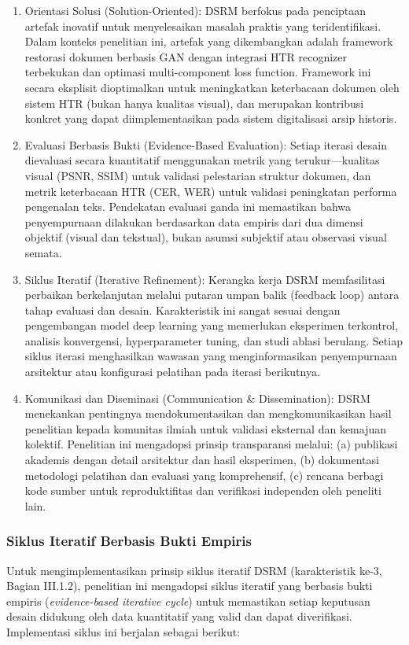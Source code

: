 \documentclass[12pt,a4paper]{article}
\begin{document}
\begin{enumerate}[label=\arabic*., leftmargin=*, nosep]
\item Orientasi Solusi (Solution-Oriented): DSRM berfokus pada penciptaan artefak inovatif untuk menyelesaikan masalah praktis yang teridentifikasi. Dalam konteks penelitian ini, artefak yang dikembangkan adalah framework restorasi dokumen berbasis GAN dengan integrasi HTR recognizer terbekukan dan optimasi multi-component loss function. Framework ini secara eksplisit dioptimalkan untuk meningkatkan keterbacaan dokumen oleh sistem HTR (bukan hanya kualitas visual), dan merupakan kontribusi konkret yang dapat diimplementasikan pada sistem digitalisasi arsip historis.

\item Evaluasi Berbasis Bukti (Evidence-Based Evaluation): Setiap iterasi desain dievaluasi secara kuantitatif menggunakan metrik yang terukur---kualitas visual (PSNR, SSIM) untuk validasi pelestarian struktur dokumen, dan metrik keterbacaan HTR (CER, WER) untuk validasi peningkatan performa pengenalan teks. Pendekatan evaluasi ganda ini memastikan bahwa penyempurnaan dilakukan berdasarkan data empiris dari dua dimensi objektif (visual dan tekstual), bukan asumsi subjektif atau observasi visual semata.

\item Siklus Iteratif (Iterative Refinement): Kerangka kerja DSRM memfasilitasi perbaikan berkelanjutan melalui putaran umpan balik (feedback loop) antara tahap evaluasi dan desain. Karakteristik ini sangat sesuai dengan pengembangan model deep learning yang memerlukan eksperimen terkontrol, analisis konvergensi, hyperparameter tuning, dan studi ablasi berulang. Setiap siklus iterasi menghasilkan wawasan yang menginformasikan penyempurnaan arsitektur atau konfigurasi pelatihan pada iterasi berikutnya.

\item Komunikasi dan Diseminasi (Communication \& Dissemination): DSRM menekankan pentingnya mendokumentasikan dan mengkomunikasikan hasil penelitian kepada komunitas ilmiah untuk validasi eksternal dan kemajuan kolektif. Penelitian ini mengadopsi prinsip transparansi melalui: (a) publikasi akademis dengan detail arsitektur dan hasil eksperimen, (b) dokumentasi metodologi pelatihan dan evaluasi yang komprehensif, (c) rencana berbagi kode sumber untuk reproduktifitas dan verifikasi independen oleh peneliti lain.
\end{enumerate}

\subsubsection{Siklus Iteratif Berbasis Bukti Empiris}
Untuk mengimplementasikan prinsip siklus iteratif DSRM (karakteristik ke-3, Bagian III.1.2), penelitian ini mengadopsi siklus iteratif yang berbasis bukti empiris (\textit{evidence-based iterative cycle}) untuk memastikan setiap keputusan desain didukung oleh data kuantitatif yang valid dan dapat diverifikasi. Implementasi siklus ini berjalan sebagai berikut:
\end{document}
